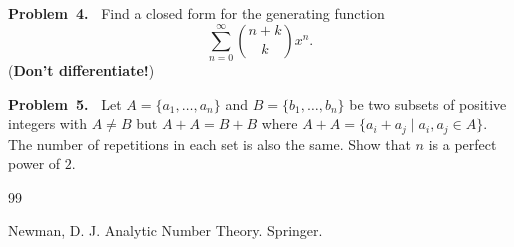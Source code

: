 \documentclass[11pt]{scrartcl}
\theoremstyle{plain}
\theoremstyle{definition}
\theoremstyle{remark}
\newcounter{problem}
\newcommand{\numproblem}[2]{%
    \noindent\textbf{Problem~#1.~}#2%
    \vspace{0.3cm}\par%
}
\begin{document}
\numproblem{4}{
    Find a closed form for the generating function
    \[
        \sum_{n=0}^{\infty} \binom{n+k}{k} x^n.
    \](\textbf{Don't differentiate!})
}

\numproblem{5}{
    Let $A=\{a_1, \dots, a_n\}$ and $B=\{b_1, \dots, b_n\}$ be two subsets of positive integers with $A\ne B$ but $A+A=B+B$ where $A+A=\{a_i+a_j \mid a_i, a_j\in A\}$. The number of repetitions in each set is also the same. Show that $n$ is a perfect power of $2$.
}

\begin{thebibliography}{99}

Newman, D. J. Analytic Number Theory. Springer.

\end{thebibliography}
\end{document}
